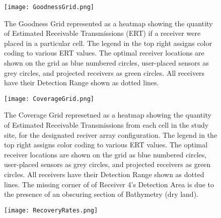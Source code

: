 \begin{figure}[h]
	\texttt{[image: GoodnessGrid.png]}
	\caption{The Goodness Grid represented as a heatmap showing the quantity of Estimated Receivable Transmissions (ERT) if a receiver were placed in a particular cell.  The legend in the top right assigns color coding to various ERT values. The optimal receiver locations are shown on the grid as blue numbered circles, user-placed sensors as grey circles, and projected receivers as green circles.  All receivers have their Detection Range shown as dotted lines.} \label{goodnessGraph}
\end{figure}

\begin{figure}[h]
	\texttt{[image: CoverageGrid.png]}
	\caption{The Coverage Grid represetned as a heatmap showing the quantity of Estimated Receivable Transmissions from each cell in the study site, for the designated reciver array configuration.  The legend in the top right assigns color coding to various ERT values.  The optimal receiver locations are shown on the grid as blue numbered circles, user-placed sensors as grey circles, and projected receivers as green circles.  All receivers have their Detection Range shown as dotted lines.  The missing corner of of Receiver 4's Detection Area is due to the presence of an obscuring section of Bathymetry (dry land).}\label{coverageGraph}
\end{figure}

\begin{figure}[h]
	\texttt{[image: RecoveryRates.png]}
	\caption{} \label{recoveryGraph}
\end{figure}